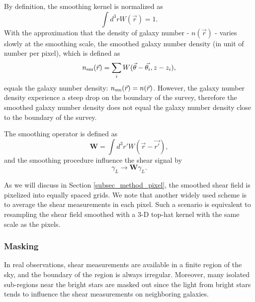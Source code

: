 By definition, the smoothing kernel is normalized as
\begin{equation}
\int d^3r W(\vec{r})=1.
\end{equation}
With the approximation that the density of galaxy number - $n(\vec{r})$ -
varies slowly at the smoothing scale, the smoothed galaxy number density (in
unit of number per pixel), which is defined as
\begin{equation}\label{eq-numDesSmooth}
n_{\rm{sm}}(\vec{r})=\sum_i W(\vec{\theta}-\vec{\theta_i},z-z_i),
\end{equation}
equals the galaxy number density: $n_{\rm{sm}}(\vec{r})=n(\vec{r})$.
However, the galaxy number density experience a steep drop on the boundary
of the survey, therefore the smoothed galaxy number density does not equal the
galaxy number density close to the boundary of the survey.

The smoothing operator is defined as
\begin{equation}
\mathbf{W} = \int d^3 r' W(\vec{r}-\vec{r'}),
\end{equation}
and the smoothing procedure influence the shear signal by
\begin{equation}
\gamma_L \rightarrow \mathbf{W} \gamma_L.
\end{equation}

As we will discuss in Section \ref{subsec_method_pixel}, the smoothed shear
field is pixelized into equally spaced grids. We note that another widely used
scheme is to average the shear measurements in each pixel.  Such a scenario is
equivalent to resampling the shear field smoothed with a $3$-D top-hat kernel
with the same scale as the pixels.

\subsubsection{Masking}
\label{subsec_method_msknoise}

In real observations, shear measurements are available in a finite region of
the sky, and the boundary of the region is always irregular. Moreover, many
isolated sub-regions near the bright stars are masked out since the light from
bright stars tends to influence the shear measurements on neighboring galaxies.

